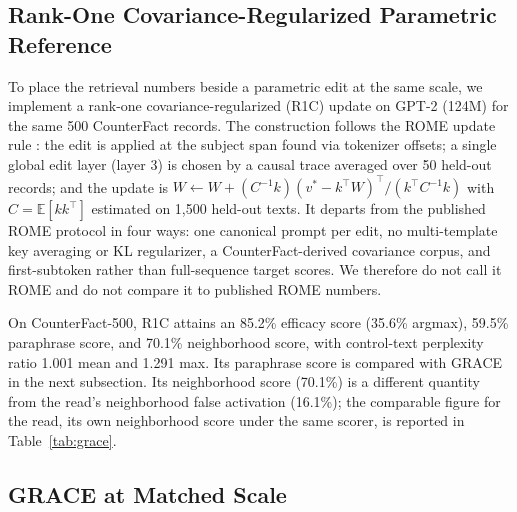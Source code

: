 \documentclass[preprint,12pt]{elsarticle}
\newcommand{\rev}[1]{#1}
\begin{document}
\subsection{Rank-One Covariance-Regularized Parametric Reference}
\label{sec:counterfact_rome}

To place the retrieval numbers beside a parametric edit at the same scale, we implement a rank-one covariance-regularized (R1C) update on GPT-2 (124M) for the same 500 CounterFact records. The construction follows the ROME update rule \cite{meng2022locating}: the edit is applied at the subject span found via tokenizer offsets; a single global edit layer (layer 3) is chosen by a causal trace averaged over 50 held-out records; and the update is $W \leftarrow W + (C^{-1}k)(v^*-k^{\top}W)^{\top}/(k^{\top}C^{-1}k)$ with $C=\mathbb{E}[kk^{\top}]$ estimated on 1,500 held-out texts. It departs from the published ROME protocol in four ways: one canonical prompt per edit, no multi-template key averaging or KL regularizer, a CounterFact-derived covariance corpus, and first-subtoken rather than full-sequence target scores. We therefore do not call it ROME and do not compare it to published ROME numbers.

On CounterFact-500, R1C attains an 85.2\% efficacy score (35.6\% argmax), 59.5\% paraphrase score, and 70.1\% neighborhood score, with control-text perplexity ratio 1.001 mean and 1.291 max. Its paraphrase score is compared with GRACE in the next subsection. \rev{Its neighborhood score (70.1\%) is a different quantity from the read's neighborhood false activation (16.1\%); the comparable figure for the read, its own neighborhood score under the same scorer, is reported in Table~\ref{tab:grace}.}

\subsection{GRACE at Matched Scale}
\label{sec:grace}
\end{document}
